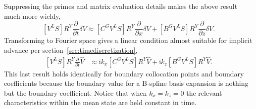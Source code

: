 \documentclass[letterpaper,11pt,nointlimits,reqno,draft]{amsart}
\newcommand{\ii}{\ensuremath{\mathrm{i}}}
\begin{document}
Suppressing the primes and matrix evaluation details makes the above result
much more wieldy,
\[
\label{eq:dimeulertransformcharnotYphys}
  \left[V^L S\right]
  R^Y
  \frac{\partial}{\partial{}t}
  \delta{}V
\approx
  \left[C^G V^L S\right]
  R^Y
  \frac{\partial}{\partial{}x}
  \delta{}V
  +
  \left[B^G V^L S\right]
  R^Y
  \frac{\partial}{\partial{}z}
  \delta{}V
.
\]
Transforming to Fourier space gives a linear condition almost suitable for
implicit advance per section~\ref{sec:timediscretization},
\begin{align}
\label{eq:dimeulertransformcharnotYwave}
  \left[V^L S\right]
  R^Y
  \frac{\partial}{\partial{}t}
  \hat{V}
&\approx
  \ii k_x
  \left[C^G V^L S\right]
  R^Y
  \hat{V}
  +
  \ii k_z
  \left[B^G V^L S\right]
  R^Y
  \hat{V}
.
\end{align}
This last result holds identically for boundary collocation points and boundary
coefficients because the boundary value for a B-spline basis expansion is
nothing but the boundary coefficient.  Notice that when $k_x=k_z=0$ the
relevant characteristics within the mean state are held constant in time.
\end{document}
